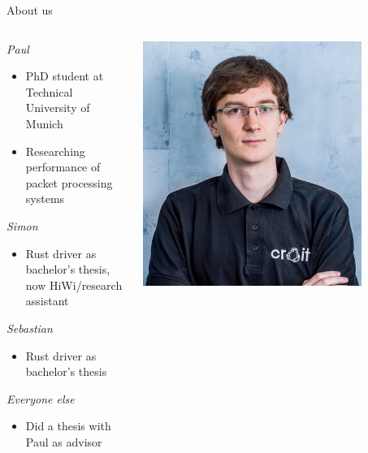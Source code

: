\documentclass[NET,english,aspectratio=169,notitleframe,draft]{tumbeamer}
\begin{document}
\begin{frame}{About us}
\begin{columns}
\begin{column}{0.8\textwidth}
\emph{Paul}
\begin{itemize}
\item PhD student at Technical University of Munich
\item Researching performance of packet processing systems
\end{itemize}
\vfill
\emph{Simon}
\begin{itemize}
\item Rust driver as bachelor's thesis, now HiWi/research assistant
\end{itemize}
\emph{Sebastian}
\begin{itemize}
\item Rust driver as bachelor's thesis
\end{itemize}
\emph{Everyone else}
\begin{itemize}
\item Did a thesis with Paul as advisor
\end{itemize}
\end{column}
\begin{column}{0.15\textwidth}
\includegraphics[width=0.8\textwidth]{pics/paul.jpg}\\

\end{column}
\end{columns}
\end{frame}
\end{document}
